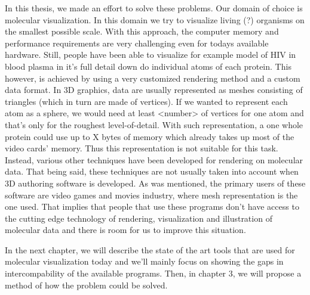 \documentclass[
  digital, %
  table,   %
  lof,     %
  lot,     %
]{fithesis3}
\begin{document}
In this thesis, we made an effort to solve these problems. Our domain of choice is molecular visualization. 
In this domain we try to visualize living (?) organisms on the smallest possible scale. With this approach, the computer memory and performance requirements are very challenging even for todays available hardware. Still, people have been able to visualize for example model of HIV in blood plasma in it's full detail down do individual atoms of each protein. This however, is achieved by using a very customized rendering method and a custom data format. In 3D graphics, data are usually represented as meshes consisting of triangles (which in turn are made of vertices). If we wanted to represent each atom as a sphere, we would need at least <number> of vertices for one atom and that's only for the roughest level-of-detail. With such representation, a one whole protein could use up to X bytes of memory which already takes up most of the video cards' memory. Thus this representation is not suitable for this task. Instead, various other techniques have been developed for rendering on molecular data.
That being said, these techniques are not usually taken into account when 3D authoring software is developed. As was mentioned, the primary users of these software are video games and movies industry, where mesh representation is the one used. That implies that people that use these programs don't have access to the cutting edge technology of rendering, visualization and illustration of molecular data and there is room for us to improve this situation.

In the next chapter, we will describe the state of the art tools that are used for molecular visualization today and we'll mainly focus on showing the gaps in intercompability of the available programs. Then, in chapter 3, we will propose a method of how the problem could be solved.
\end{document}
